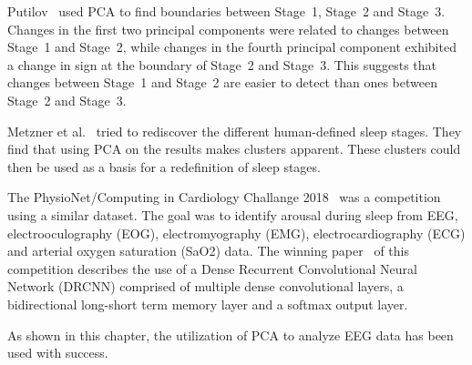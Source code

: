 Putilov~\cite{Putilov2015} used PCA to find boundaries between Stage~1, Stage~2 and Stage~3. Changes in the first two principal components were related to changes between Stage~1 and Stage~2, while changes in the fourth principal component exhibited a change in sign at the boundary of Stage~2 and Stage~3. This suggests that changes between Stage~1 and Stage~2 are easier to detect than ones between Stage~2 and Stage~3.

Metzner et al.~\cite{Metzner2023} tried to rediscover the different human-defined sleep stages. They find that using PCA on the results makes clusters apparent. These clusters could then be used as a basis for a redefinition of sleep stages.

The PhysioNet/Computing in Cardiology Challange 2018~\cite{Ghassemi2018} was a competition using a similar dataset. The goal was to identify arousal during sleep from EEG, electrooculography (EOG), electromyography (EMG), electrocardiography (ECG) and arterial oxygen saturation (SaO2) data. The winning paper~\cite{Howe2018} of this competition describes the use of a Dense Recurrent Convolutional Neural Network (DRCNN) comprised of multiple dense convolutional layers, a bidirectional long-short term memory layer and a softmax output layer.

As shown in this chapter, the utilization of PCA to analyze EEG data has been used with success.
